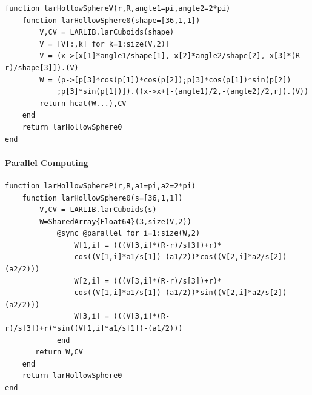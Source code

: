 \documentclass{article}
\begin{document}
\begin{verbatim}
function larHollowSphereV(r,R,angle1=pi,angle2=2*pi)
    function larHollowSphere0(shape=[36,1,1])
        V,CV = LARLIB.larCuboids(shape)
        V = [V[:,k] for k=1:size(V,2)]
        V = (x->[x[1]*angle1/shape[1], x[2]*angle2/shape[2], x[3]*(R-r)/shape[3]]).(V)
        W = (p->[p[3]*cos(p[1])*cos(p[2]);p[3]*cos(p[1])*sin(p[2])
            ;p[3]*sin(p[1])]).((x->x+[-(angle1)/2,-(angle2)/2,r]).(V))
        return hcat(W...),CV
    end
    return larHollowSphere0
end
\end{verbatim}

\paragraph{Parallel Computing}
\begin{Verbatim}
function larHollowSphereP(r,R,a1=pi,a2=2*pi)
    function larHollowSphere0(s=[36,1,1])
        V,CV = LARLIB.larCuboids(s)
        W=SharedArray{Float64}(3,size(V,2))
            @sync @parallel for i=1:size(W,2)
                W[1,i] = (((V[3,i]*(R-r)/s[3])+r)*
                cos((V[1,i]*a1/s[1])-(a1/2))*cos((V[2,i]*a2/s[2])-(a2/2)))
                W[2,i] = (((V[3,i]*(R-r)/s[3])+r)*
                cos((V[1,i]*a1/s[1])-(a1/2))*sin((V[2,i]*a2/s[2])-(a2/2)))
                W[3,i] = (((V[3,i]*(R-r)/s[3])+r)*sin((V[1,i]*a1/s[1])-(a1/2)))
            end
       return W,CV
    end
    return larHollowSphere0
end
\end{Verbatim}
\end{document}

